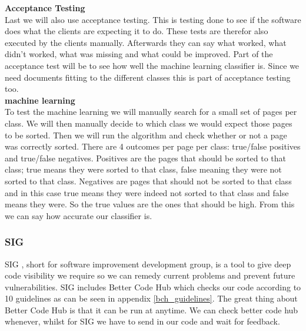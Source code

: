 \textbf{Acceptance Testing}\\
Last we will also use acceptance testing. This is testing done to see if the software does what the clients are expecting it to do. These tests are therefor also executed by the clients manually. Afterwards they can say what worked, what didn't worked, what was missing and what could be improved. Part of the acceptance test will be to see how well the machine learning classifier is. Since we need documents fitting to the different classes this is part of acceptance testing too.\\
\textbf{machine learning} \\
To test the machine learning we will manually search for a small set of pages per class. We will then manually decide to which class we would expect those pages to be sorted. Then we will run the algorithm and check whether or not a page was correctly sorted. There are 4 outcomes per page per class: true/false positives and true/false negatives. Positives are the pages that should be sorted to that class; true means they were sorted to that class, false meaning they were not sorted to that class. Negatives are pages that should not be sorted to that class and in this case true means they were indeed not sorted to that class and false means they were. So the true values are the ones that should be high. From this we can say how accurate our classifier is. \\

\subsubsection{SIG}
SIG \cite{sig}, short for software improvement development group, is a tool to give deep code visibility we require so we can remedy current problems and prevent future vulnerabilities. SIG includes Better Code Hub \cite{better_code_hub} which checks our code according to 10 guidelines as can be seen in appendix \ref{bch_guidelines}. The great thing about Better Code Hub is that it can be run at anytime. We can check better code hub whenever, whilst for SIG we have to send in our code and wait for feedback.


\begin{comment}
- double city names
- city names with meaning (leiden)
- city/province names (utrecht / groningen / zeeland)
\end{comment}